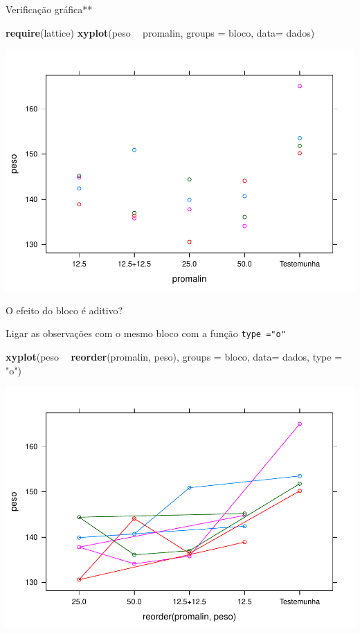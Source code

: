 \documentclass[
]{book}
\newenvironment{Shaded}{\begin{snugshade}}{\end{snugshade}}
\newcommand{\DataTypeTok}[1]{\textcolor[rgb]{0.13,0.29,0.53}{#1}}
\newcommand{\KeywordTok}[1]{\textcolor[rgb]{0.13,0.29,0.53}{\textbf{#1}}}
\newcommand{\NormalTok}[1]{#1}
\newcommand{\OperatorTok}[1]{\textcolor[rgb]{0.81,0.36,0.00}{\textbf{#1}}}
\newcommand{\StringTok}[1]{\textcolor[rgb]{0.31,0.60,0.02}{#1}}
\begin{document}
Verificação gráfica**

\begin{Shaded}
\begin{Highlighting}[]
\KeywordTok{require}\NormalTok{(lattice)}
\KeywordTok{xyplot}\NormalTok{(peso }\OperatorTok{~}\StringTok{ }\NormalTok{promalin, }
        \DataTypeTok{groups =}\NormalTok{ bloco, }
        \DataTypeTok{data=}\NormalTok{ dados)}
\end{Highlighting}
\end{Shaded}

\includegraphics{TudodoR_files/figure-latex/unnamed-chunk-281-1.pdf}

O efeito do bloco é aditivo?

Ligar as observações com o mesmo bloco com a função \texttt{type\ ="o"}

\begin{Shaded}
\begin{Highlighting}[]
\KeywordTok{xyplot}\NormalTok{(peso }\OperatorTok{~}\StringTok{ }\KeywordTok{reorder}\NormalTok{(promalin, peso), }
        \DataTypeTok{groups =}\NormalTok{ bloco, }
        \DataTypeTok{data=}\NormalTok{ dados,}
        \DataTypeTok{type =} \StringTok{"o"}\NormalTok{)}
\end{Highlighting}
\end{Shaded}

\includegraphics{TudodoR_files/figure-latex/unnamed-chunk-282-1.pdf}
\end{document}

